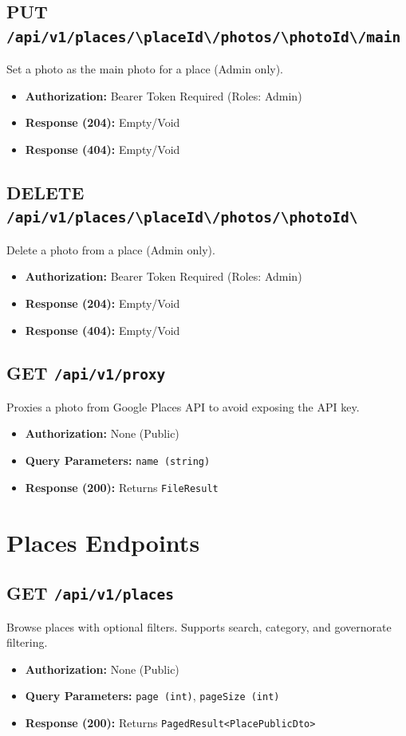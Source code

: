 \subsection{PUT \texttt{/api/v1/places/\textbackslash{}{placeId\textbackslash{}}/photos/\textbackslash{}{photoId\textbackslash{}}/main}}
Set a photo as the main photo for a place (Admin only).
\begin{itemize}
    \item \textbf{Authorization:} Bearer Token Required (Roles: Admin)
    \item \textbf{Response (204):} Empty/Void
    \item \textbf{Response (404):} Empty/Void
\end{itemize}

\subsection{DELETE \texttt{/api/v1/places/\textbackslash{}{placeId\textbackslash{}}/photos/\textbackslash{}{photoId\textbackslash{}}}}
Delete a photo from a place (Admin only).
\begin{itemize}
    \item \textbf{Authorization:} Bearer Token Required (Roles: Admin)
    \item \textbf{Response (204):} Empty/Void
    \item \textbf{Response (404):} Empty/Void
\end{itemize}

\subsection{GET \texttt{/api/v1/proxy}}
Proxies a photo from Google Places API to avoid exposing the API key.
\begin{itemize}
    \item \textbf{Authorization:} None (Public)
    \item \textbf{Query Parameters:} \texttt{name (string)}
    \item \textbf{Response (200):} Returns \texttt{FileResult}
\end{itemize}

\section{Places Endpoints}

\subsection{GET \texttt{/api/v1/places}}
Browse places with optional filters. Supports search, category, and governorate filtering.
\begin{itemize}
    \item \textbf{Authorization:} None (Public)
    \item \textbf{Query Parameters:} \texttt{page (int)}, \texttt{pageSize (int)}
    \item \textbf{Response (200):} Returns \texttt{PagedResult<PlacePublicDto>}
\end{itemize}

